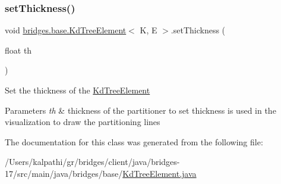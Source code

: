 \subsubsection{\texorpdfstring{set\+Thickness()}{setThickness()}}
{\footnotesize\ttfamily void \mbox{\hyperlink{classbridges_1_1base_1_1_kd_tree_element}{bridges.\+base.\+Kd\+Tree\+Element}}$<$ K, E $>$.set\+Thickness (\begin{DoxyParamCaption}\item[{float}]{th }\end{DoxyParamCaption})}

Set the thickness of the \mbox{\hyperlink{classbridges_1_1base_1_1_kd_tree_element}{Kd\+Tree\+Element}} 
\begin{DoxyParams}{Parameters}
{\em th} & thickness of the partitioner to set thickness is used in the visualization to draw the partitioning lines \\
\hline
\end{DoxyParams}


The documentation for this class was generated from the following file\+:\begin{DoxyCompactItemize}
\item 
/\+Users/kalpathi/gr/bridges/client/java/bridges-\/17/src/main/java/bridges/base/\mbox{\hyperlink{_kd_tree_element_8java}{Kd\+Tree\+Element.\+java}}\end{DoxyCompactItemize}
